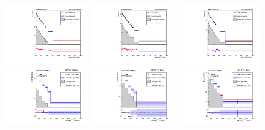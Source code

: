 \begin{figure}[hbtp]\begin{center}
 \includegraphics[width=0.32\textwidth]{fig/post_fit_photon_inclusive.pdf}
 \includegraphics[width=0.32\textwidth]{fig/post_fit_zmm_inclusive.pdf}
 \includegraphics[width=0.32\textwidth]{fig/post_fit_wmn_inclusive.pdf}\\
 \includegraphics[width=0.32\textwidth]{fig/post_fit_photon_resolved.pdf}
 \includegraphics[width=0.32\textwidth]{fig/post_fit_zmm_resolved.pdf}
 \includegraphics[width=0.32\textwidth]{fig/post_fit_wmn_resolved.pdf}\\

\end{center}
\end{figure}
